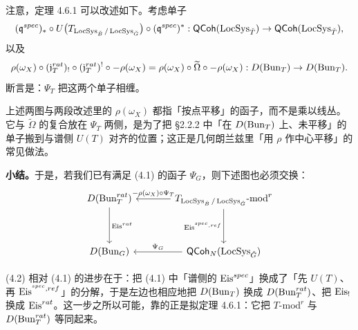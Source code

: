 注意，定理 4.6.1 可以改述如下。考虑单子
\[
  (\mathfrak{q}^{spec})_*\circ U\bigl(T_{\operatorname{LocSys}_{\check B}/\operatorname{LocSys}_{\check G}}\bigr)\circ(\mathfrak{q}^{spec})^*
  : \mathsf{QCoh}(\operatorname{LocSys}_{\check T})\to\mathsf{QCoh}(\operatorname{LocSys}_{\check T}),
\]
以及
\[
  \rho(\omega_X)\circ(\mathfrak{j}^{rat}_T)_!\circ(\mathfrak{j}^{rat}_T)^!\circ-\rho(\omega_X)
  =\rho(\omega_X)\circ\widetilde\Omega\circ-\rho(\omega_X)
  : D(\operatorname{Bun}_T)\to D(\operatorname{Bun}_T).
\]
断言是：$\Psi_T$ 把这两个单子相缠。

\begin{annote}
上述两图与两段改述里的 $\rho(\omega_X)$ 都指「按点平移」的函子，而不是乘以线丛。它与 $\widetilde\Omega$ 的复合放在 $\Psi_T$ 两侧，是为了把 §2.2.2 中「在 $D(\operatorname{Bun}_T)$ 上、未平移」的单子搬到与谱侧 $U(T)$ 对齐的位置；这正是几何朗兰兹里「用 $\rho$ 作中心平移」的常见做法。\par\vspace{0.15em}{\raggedleft 【来源：原书 p.8 §4.6（A）；[GL:Eis] 的做法（A）】\par}
\end{annote}

\textbf{小结。}于是，若我们已有满足 (4.1) 的函子 $\Psi_G$，则下述图也必须交换：
\begin{equation}
\begin{tikzcd}[row sep=3.6em, column sep=3.6em, ampersand replacement=\&]
  D(\Bun\rt_T) \& T_{\LocSys_{\Ch B}/\LocSys_{\Ch G}}\text{-}\mathrm{mod}^r
    \arrow[l, "-\rho(\omega_X)\circ\Psi_T"'] \\
  D(\Bun_G) \& \QCoh_N(\LocSys_{\Ch G})
    \arrow[l, "\Psi_G"']
    \arrow[from=1-1, to=2-1, "\Eis\rt"]
    \arrow[from=1-2, to=2-2, "\Eis^{\st,ref}"']
\end{tikzcd}
\label{eq:4.2}
\end{equation}

\begin{annote}
(4.2) 相对 (4.1) 的进步在于：把 (4.1) 中「谱侧的 $\mathrm{Eis}^{spec}$」换成了「先 $U(T)$、再 $\mathrm{Eis}^{^{spec},ref}$」的分解，于是左边也相应地把 $D(\operatorname{Bun}_T)$ 换成 $D(\operatorname{Bun}^{rat}_T)$、把 $\mathrm{Eis}_!$ 换成 $\mathrm{Eis}^{rat}$。这一步之所以可能，靠的正是拟定理 4.6.1：它把 $T\text{-}\mathrm{mod}^r$ 与 $D(\operatorname{Bun}^{rat}_T)$ 等同起来。\par\vspace{0.15em}{\raggedleft 【来源：原书 p.8 §4.7（A）】\par}
\end{annote}
